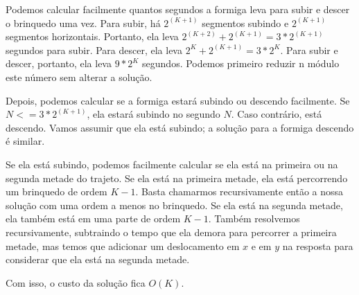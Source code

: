 Podemos calcular facilmente quantos segundos a formiga leva para subir e descer o brinquedo uma vez. Para subir, há $2^(K + 1)$ segmentos subindo e $2^(K + 1)$ segmentos horizontais. Portanto, ela leva $2^(K + 2) + 2^(K + 1) = 3 * 2^(K+1)$ segundos para subir. Para descer, ela leva $2^K + 2^(K + 1) = 3 * 2^K$. Para subir e descer, portanto, ela leva $9 * 2^K$ segundos. Podemos primeiro reduzir n módulo este número sem alterar a solução.

Depois, podemos calcular se a formiga estará subindo ou descendo facilmente. Se $N <= 3 * 2^(K + 1)$, ela estará subindo no segundo $N$. Caso contrário, está descendo. Vamos assumir que ela está subindo; a solução para a formiga descendo é similar.

Se ela está subindo, podemos facilmente calcular se ela está na primeira ou na segunda metade do trajeto. Se ela está na primeira metade, ela está percorrendo um brinquedo de ordem $K - 1$. Basta chamarmos recursivamente então a nossa solução com uma ordem a menos no brinquedo. Se ela está na segunda metade, ela também está em uma parte de ordem $K - 1$. Também resolvemos recursivamente, subtraindo o tempo que ela demora para percorrer a primeira metade, mas temos que adicionar um deslocamento em $x$ e em $y$ na resposta para considerar que ela está na segunda metade.

Com isso, o custo da solução fica $O(K)$.
